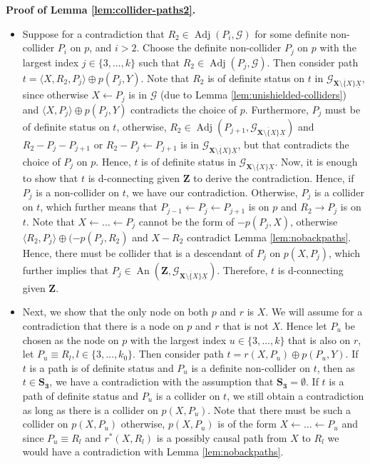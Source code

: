 \documentclass[11pt]{article}
\DeclareMathOperator{\An}{An}
\DeclareMathOperator{\Adj}{Adj}
\newcommand{\mb}[1]{\mathbf{#1}}
\newcommand{\g}[1][G]{\mathcal{#1}}
\newenvironment{proofofnoqed}[1][]{\noindent \textbf{Proof of #1.}}{}
\begin{document}
\begin{proofofnoqed}[Lemma \ref{lem:collider-paths2}]
\begin{itemize}
        \item[\ref{rprop4p}]
        Suppose for a contradiction that $R_2 \in \Adj(P_i, \g)$ for some definite non-collider $P_i$ on $p$, and $i > 2$. Choose the definite non-collider $P_j$ on $p$ with the largest index $j \in \{3, \dots, k\}$ such that $R_2 \in \Adj(P_j, \g)$. Then consider path $t = \langle X, R_2, P_j \rangle \oplus p(P_j, Y)$. Note that $R_2$ is of definite status on $t$ in $\g_{\overline{\mb{X} \setminus \{X\}} \underline{X}}$, since otherwise $X \gets P_j$ is in $\g$ (due to Lemma \ref{lem:unishielded-colliders}) and $\langle X, P_j \rangle \oplus p(P_j, Y)$ contradicts the choice of $p$. Furthermore, $P_j$ must be of definite status on $t$, otherwise, $R_2 \in \Adj(P_{j+1}, \g_{\overline{\mb{X} \setminus \{X\}} \underline{X}})$ and $R_2 - P_j - P_{j+1}$ or $R_2 - P_j \gets P_{j+1}$ is in $\g_{\overline{\mb{X} \setminus \{X\}} \underline{X}}$, but that contradicts the choice of $P_j$ on $p$. Hence, $t$ is of definite status in $\g_{\overline{\mb{X} \setminus \{X\}} \underline{X}}$. Now, it is enough to show that $t$ is d-connecting given $\mb{Z}$ to derive the contradiction. Hence, if $P_j$ is a non-collider on $t$, we have our contradiction. Otherwise, $P_j$ is a collider on $t$, which further means that $P_{j-1} \gets P_j \gets P_{j+1}$ is on $p$ and $R_2 \to P_j$ is on $t$. Note that $X \gets \dots \gets P_j$ cannot be the form of $-p(P_j, X)$, otherwise $\langle R_2, P_j \rangle \oplus (-p(P_j, R_2)$ and $X - R_2$ contradict Lemma \ref{lem:nobackpaths}. Hence, there must be collider that is a descendant of $P_j$ on $p(X, P_j)$, which further implies that $P_j \in \An(\mb{Z}, \g_{\overline{\mb{X} \setminus \{X\}} \underline{X}})$. Therefore, $t$ is d-connecting given $\mb{Z}$.

        \item[\ref{rprop4}]
        Next, we show that the only node on both $p$ and $r$ is $X$. We will assume for a contradiction that there is a node on $p$ and $r$ that is not $X$. Hence let $P_u$ be chosen as the node on $p$ with the largest index $u \in \{3, \dots, k\}$ that is also on $r$, let $P_u \equiv R_l, l \in \{3, \dots, k_0\}$. Then consider path $t = r(X, P_u) \oplus p(P_u, Y)$. If $t$ is a path is of definite status and $P_u$ is a definite non-collider on $t$, then as $t \in \mb{S_3}$, we have a contradiction with the assumption that  $\mb{S_3} =\emptyset$.  If $t$ is a path of definite status and $P_u$ is a collider on $t$, we still obtain a contradiction as long as there is a collider on $p(X,P_u)$. Note that there must be such a collider on $p(X,P_u)$ otherwise, $p(X, P_u)$ is of the form $X \gets \dots \gets P_u$ and since $P_u \equiv R_l$ and $r^{*}(X,R_l)$ is a possibly causal path from $X$ to $R_l$ we would have a contradiction with Lemma \ref{lem:nobackpaths}. 


\end{itemize}
\end{proofofnoqed}
\end{document}
